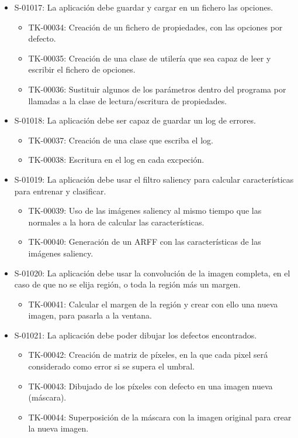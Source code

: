 \begin{itemize}
 \item S-01017: La aplicación debe guardar y cargar en un fichero las opciones.
  \begin{itemize}
   \item TK-00034: Creación de un fichero de propiedades, con las opciones por defecto.
   \item TK-00035: Creación de una clase de utilería que sea capaz de leer y escribir el fichero de opciones.
   \item TK-00036: Sustituir algunos de los parámetros dentro del programa por llamadas a la clase de lectura/escritura de propiedades.
  \end{itemize}
 \item S-01018: La aplicación debe ser capaz de guardar un log de errores.
  \begin{itemize}
   \item TK-00037: Creación de una clase que escriba el log.
   \item TK-00038: Escritura en el log en cada excpeción.
  \end{itemize}
 \item S-01019: La aplicación debe usar el filtro saliency para calcular características para entrenar y clasificar.
  \begin{itemize}
   \item TK-00039: Uso de las imágenes saliency al mismo tiempo que las normales a la hora de calcular las características.
   \item TK-00040: Generación de un ARFF con las características de las imágenes saliency.
  \end{itemize}
 \item S-01020: La aplicación debe usar la convolución de la imagen completa, en el caso de que no se elija región, o toda la región más un margen.
  \begin{itemize}
   \item TK-00041: Calcular el margen de la región y crear con ello una nueva imagen, para pasarla a la ventana.
  \end{itemize}
 \item S-01021: La aplicación debe poder dibujar los defectos encontrados.
  \begin{itemize}
   \item TK-00042: Creación de matriz de píxeles, en la que cada pixel será considerado como error si se supera el umbral.
   \item TK-00043: Dibujado de los píxeles con defecto en una imagen nueva (máscara).
   \item TK-00044: Superposición de la máscara con la imagen original para crear la nueva imagen.

\end{itemize}
\end{itemize}
